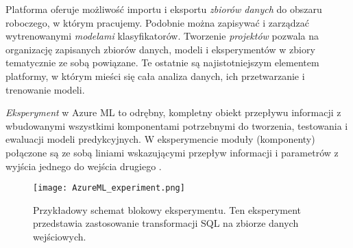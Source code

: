Platforma oferuje możliwość importu i eksportu \emph{zbiorów danych} do obszaru roboczego, w którym pracujemy.
Podobnie można zapisywać i zarządzać wytrenowanymi \emph{modelami} klasyfikatorów.
Tworzenie \emph{projektów} pozwala na organizację zapisanych zbiorów danych, modeli i eksperymentów w zbiory tematycznie ze sobą powiązane.
Te ostatnie są najistotniejszym elementem platformy, w którym mieści się cała analiza danych, ich przetwarzanie i trenowanie modeli.

\emph{Eksperyment} w Azure ML to odrębny, kompletny obiekt przepływu informacji z wbudowanymi wszystkimi komponentami potrzebnymi do tworzenia, testowania i ewaluacji modeli predykcyjnych.
W eksperymencie moduły (komponenty) połączone są ze sobą liniami wskazującymi przepływ informacji i parametrów z wyjścia jednego do wejścia drugiego \cite{barga2015introducing}.

\begin{figure}[ht]
	\texttt{[image: AzureML\_experiment.png]}
	\caption{Przykładowy schemat blokowy eksperymentu. Ten eksperyment przedstawia zastosowanie transformacji SQL na zbiorze danych wejściowych.}
\end{figure}

